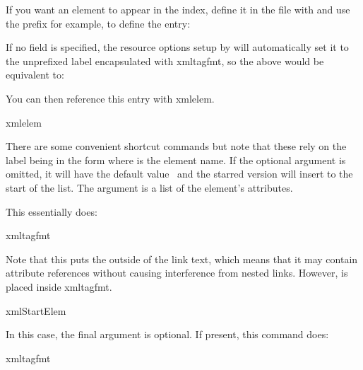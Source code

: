 \documentclass[toc=listof]{scrreport}
\begin{document}
If you want an element to appear in the index, define it in
the  file with  and
use the prefix  for example, to define the
 entry:
\begin{codebox}
\end{codebox}
If no  field is specified, the resource options setup by
 will automatically set it to the unprefixed label
encapsulated with \gls{xmltagfmt}, so the above would be equivalent to:
\begin{codebox}
\end{codebox}
You can then reference this entry with \gls{xmlelem}.
\begin{coderesult}
\gls{xmlelem}
\tcblower
{}
\end{coderesult}

There are some convenient shortcut commands but note that these rely
on the label being in the form  where
 is the element name. If the
 optional argument is omitted, it will have the default
value \ and the starred version will insert
 to the start of the  list.
The  argument is a list of the element's attributes.

This essentially does:
\begin{compactcodebox}
\gls{xmltagfmt}
\end{compactcodebox}
Note that this puts the  outside of the link text,
which means that it may contain attribute references without causing
interference from nested links. However,  is placed
inside \gls{xmltagfmt}.
\begin{coderesult}
\gls{xmlStartElem}
\tcblower
{}
\end{coderesult}

In this case, the final  argument is optional. If
present, this command does:
\begin{compactcodebox}
\gls{xmltagfmt}
\end{compactcodebox}
\end{document}

